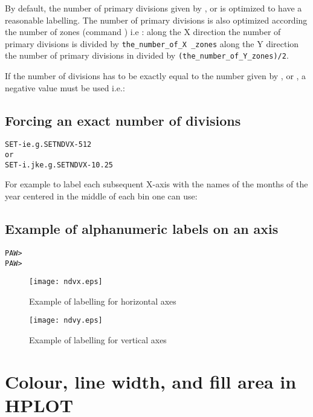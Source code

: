By default, the number of primary divisions given by , 
 or  is optimized to have a 
reasonable labelling. The number of primary divisions is also optimized 
according the number of zones (command ) i.e : 
along the X direction the number of primary divisions is divided by 
\texttt{the_number_of_X _zones} along the Y direction the number of primary 
divisions in divided by \texttt{(the_number_of_Y_zones)/2}.

If the number of divisions has to be exactly equal to the
number given by ,  or
, a negative value must be used i.e.:
\subsection*{Forcing an exact number of divisions}
\begin{alltt}
    SET  -i            e.g. SET NDVX -512
or
    SET  -i.jk         e.g. SET NDVX -10.25
\end{alltt}

For example to label each subsequent X-axis with the names of the
months of the year centered in the middle of each bin one can use:
\subsection*{Example of alphanumeric labels on an axis}
\begin{alltt}
PAW > 
PAW > 
\end{alltt}

\begin{figure}[p]
\centering\texttt{[image: ndvx.eps]}
\caption{Example of labelling for horizontal axes}
\label{fig:LABNDVX}

\medskip

\centering\texttt{[image: ndvy.eps]}
\caption{Example of labelling for vertical axes}
\label{fig:LABNDVY}
\end{figure}

\section{Colour, line width, and fill area in HPLOT}

